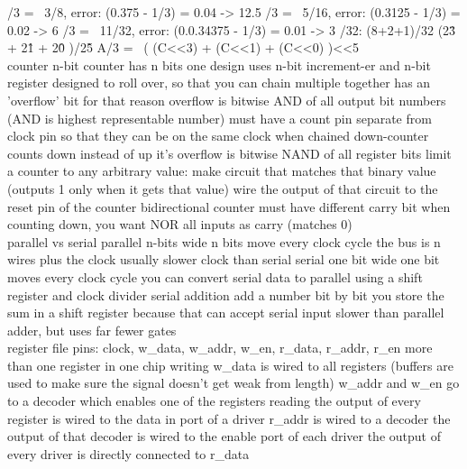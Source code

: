 \documentclass{article}
\begin{document}
\begin{multicols*}{2}
\begin{outline}[compactitem]
/3 =~ 3/8,   error: (0.375     - 1/3) = 0.04 -> 12.5 %
/3 =~ 5/16,  error: (0.3125    - 1/3) = 0.02 ->  6   %
/3 =~ 11/32, error: (0.0.34375 - 1/3) = 0.01 ->  3   %
/32:
\2         (8+2+1)/32
\2         (2\^3 + 2\^1 + 2\^0 )/2\^5
\2         A/3 =~ ( (C<<3) + (C<<1) + (C<<0) )<<5
\noindent \\ 
\0 counter
\1     n-bit counter has n bits
\2         one design uses n-bit increment-er and n-bit register
\1     designed to roll over, so that you can chain multiple together
\2         has an 'overflow' bit for that reason
\2         overflow is bitwise AND of all output bit numbers
\3             (AND is highest representable number)
\2         must have a count pin separate from clock pin
\3             so that they can be on the same clock when chained
\1     down-counter counts down instead of up
\2         it's overflow is bitwise NAND of all register bits
\1     limit a counter to any arbitrary value:
\2         make circuit that matches that binary value (outputs 1 only when it gets that value)
\2         wire the output of that circuit to the reset pin of the counter
\0 bidirectional counter
\1     must have different carry bit
\1     when counting down, you want NOR all inputs as carry (matches 0)
\noindent \\ 
\0 parallel vs serial
\1     parallel
\2         n-bits wide
\2         n bits move every clock cycle
\2         the bus is n wires plus the clock
\2         usually slower clock than serial
\1     serial
\2         one bit wide
\2         one bit moves every clock cycle
\1     you can convert serial data to parallel using a shift register and clock divider
\0 serial addition
\1     add a number bit by bit
\1     you store the sum in a shift register because that can accept serial input
\1     slower than parallel adder, but uses far fewer gates
\noindent \\ 
\0 register file
\1     pins: clock, w\_data, w\_addr, w\_en, r\_data, r\_addr, r\_en
\1     more than one register in one chip
\1     writing
\2         w\_data is wired to all registers
\3             (buffers are used to make sure the signal doesn't get weak from length)
\2         w\_addr and w\_en go to a decoder which enables one of the registers
\1     reading
\2         the output of every register is wired to the data in port of a driver
\2         r\_addr is wired to a decoder
\2         the output of that decoder is wired to the enable port of each driver
\2         the output of every driver is directly connected to r\_data

\end{outline}
\end{multicols*}
\end{document}

